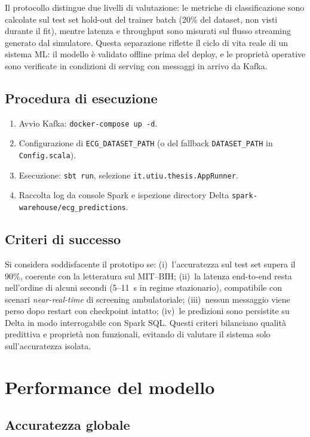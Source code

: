 Il protocollo distingue due livelli di valutazione: le metriche di classificazione sono calcolate sul test set hold-out del trainer batch (20\% del dataset, non visti durante il fit), mentre latenza e throughput sono misurati sul flusso streaming generato dal simulatore.
Questa separazione riflette il ciclo di vita reale di un sistema ML: il modello è validato offline prima del deploy, e le proprietà operative sono verificate in condizioni di serving con messaggi in arrivo da Kafka.

\subsection{Procedura di esecuzione}

\begin{enumerate}
  \item Avvio Kafka: \texttt{docker-compose up -d}.
  \item Configurazione di \texttt{ECG\_DATASET\_PATH} (o del fallback \texttt{DATASET\_PATH} in \texttt{Config.scala}).
  \item Esecuzione: \texttt{sbt run}, selezione \texttt{it.utiu.thesis.AppRunner}.
  \item Raccolta log da console Spark e ispezione directory Delta \texttt{spark-warehouse/ecg\_predictions}.
\end{enumerate}

\subsection{Criteri di successo}

Si considera soddisfacente il prototipo se: (i)~l'accuratezza sul test set supera il 90\%, coerente con la letteratura sul MIT--BIH; (ii)~la latenza end-to-end resta nell'ordine di alcuni secondi (5--11~s in regime stazionario), compatibile con scenari \emph{near-real-time} di screening ambulatoriale; (iii)~nessun messaggio viene perso dopo restart con checkpoint intatto; (iv)~le predizioni sono persistite su Delta in modo interrogabile con Spark SQL.
Questi criteri bilanciano qualità predittiva e proprietà non funzionali, evitando di valutare il sistema solo sull'accuratezza isolata.

\section{Performance del modello}\label{sec:performance-modello}

\subsection{Accuratezza globale}

